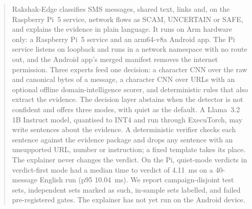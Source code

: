 \begin{abstract}
Rakshak-Edge classifies SMS messages, shared text, links and, on the Raspberry Pi~5 service, network flows as SCAM, UNCERTAIN or SAFE, and explains the evidence in plain language. It runs on Arm hardware only: a Raspberry Pi~5 service and an arm64-v8a Android app. The Pi service listens on loopback and runs in a network namespace with no route out, and the Android app's merged manifest removes the internet permission. Three experts feed one decision: a character CNN over the raw and canonical bytes of a message, a character CNN over URLs with an optional offline domain-intelligence scorer, and deterministic rules that also extract the evidence. The decision layer abstains when the detector is not confident and offers three modes, with quiet as the default. A Llama~3.2 1B Instruct model, quantised to INT4 and run through ExecuTorch, may write sentences about the evidence. A deterministic verifier checks each sentence against the evidence package and drops any sentence with an unsupported URL, number or instruction; a fixed template takes its place. The explainer never changes the verdict. On the Pi, quiet-mode verdicts in verdict-first mode had a median time to verdict of 4.11~ms\prose{} on a 40-message English run (p95 10.04~ms). We report campaign-disjoint test sets, independent sets marked as such, in-sample sets labelled, and failed pre-registered gates. The explainer has not yet run on the Android device.
\end{abstract}
